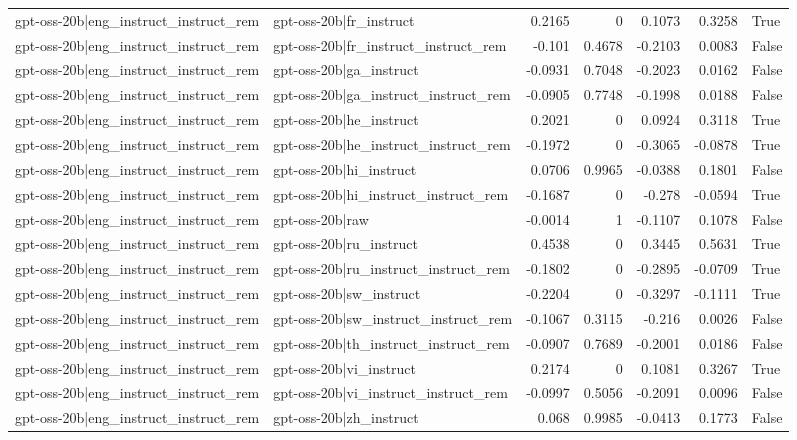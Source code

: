 \begin{table}
\begin{tabular}{l l r r r r l}
gpt-oss-20b|eng_instruct_instruct_rem & gpt-oss-20b|fr_instruct & 0.2165 & 0 & 0.1073 & 0.3258 & True \\
gpt-oss-20b|eng_instruct_instruct_rem & gpt-oss-20b|fr_instruct_instruct_rem & -0.101 & 0.4678 & -0.2103 & 0.0083 & False \\
gpt-oss-20b|eng_instruct_instruct_rem & gpt-oss-20b|ga_instruct & -0.0931 & 0.7048 & -0.2023 & 0.0162 & False \\
gpt-oss-20b|eng_instruct_instruct_rem & gpt-oss-20b|ga_instruct_instruct_rem & -0.0905 & 0.7748 & -0.1998 & 0.0188 & False \\
gpt-oss-20b|eng_instruct_instruct_rem & gpt-oss-20b|he_instruct & 0.2021 & 0 & 0.0924 & 0.3118 & True \\
gpt-oss-20b|eng_instruct_instruct_rem & gpt-oss-20b|he_instruct_instruct_rem & -0.1972 & 0 & -0.3065 & -0.0878 & True \\
gpt-oss-20b|eng_instruct_instruct_rem & gpt-oss-20b|hi_instruct & 0.0706 & 0.9965 & -0.0388 & 0.1801 & False \\
gpt-oss-20b|eng_instruct_instruct_rem & gpt-oss-20b|hi_instruct_instruct_rem & -0.1687 & 0 & -0.278 & -0.0594 & True \\
gpt-oss-20b|eng_instruct_instruct_rem & gpt-oss-20b|raw & -0.0014 & 1 & -0.1107 & 0.1078 & False \\
gpt-oss-20b|eng_instruct_instruct_rem & gpt-oss-20b|ru_instruct & 0.4538 & 0 & 0.3445 & 0.5631 & True \\
gpt-oss-20b|eng_instruct_instruct_rem & gpt-oss-20b|ru_instruct_instruct_rem & -0.1802 & 0 & -0.2895 & -0.0709 & True \\
gpt-oss-20b|eng_instruct_instruct_rem & gpt-oss-20b|sw_instruct & -0.2204 & 0 & -0.3297 & -0.1111 & True \\
gpt-oss-20b|eng_instruct_instruct_rem & gpt-oss-20b|sw_instruct_instruct_rem & -0.1067 & 0.3115 & -0.216 & 0.0026 & False \\
gpt-oss-20b|eng_instruct_instruct_rem & gpt-oss-20b|th_instruct_instruct_rem & -0.0907 & 0.7689 & -0.2001 & 0.0186 & False \\
gpt-oss-20b|eng_instruct_instruct_rem & gpt-oss-20b|vi_instruct & 0.2174 & 0 & 0.1081 & 0.3267 & True \\
gpt-oss-20b|eng_instruct_instruct_rem & gpt-oss-20b|vi_instruct_instruct_rem & -0.0997 & 0.5056 & -0.2091 & 0.0096 & False \\
gpt-oss-20b|eng_instruct_instruct_rem & gpt-oss-20b|zh_instruct & 0.068 & 0.9985 & -0.0413 & 0.1773 & False \\

\end{tabular}
\end{table}
